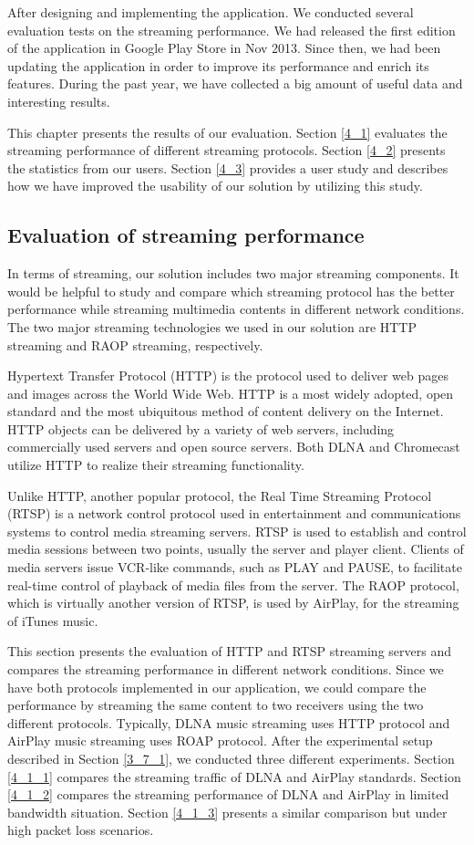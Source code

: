 
After designing and implementing the application. We conducted several
evaluation tests on the streaming performance. We had released the first
edition of the application in Google Play Store in Nov 2013. Since then, we had
been updating the application in order to improve its performance and enrich
its features. During the past year, we have collected a big amount of
useful data and interesting results.

This chapter presents the results of our evaluation. Section \ref{4_1} evaluates
the streaming performance of different streaming protocols. Section \ref{4_2}
presents the statistics from our users. Section \ref{4_3} provides a user study
and describes how we have improved the usability of our solution by utilizing
this study.
\subsection{Evaluation of streaming performance\label{4_1}}
In terms of streaming, our solution includes two major streaming components. It
would be helpful to study and compare which streaming protocol has the better
performance while streaming multimedia contents in different network conditions.
The two major streaming technologies we used in our solution are HTTP streaming
and RAOP streaming, respectively.

Hypertext Transfer Protocol (HTTP) is the protocol used to deliver web pages
and images across the World Wide Web. HTTP is a most widely adopted, open
standard and the most ubiquitous method of content delivery on the Internet.
HTTP objects can be delivered by a variety of web servers, including
commercially used servers and open source servers. Both DLNA and Chromecast utilize
HTTP to realize their streaming functionality.

Unlike HTTP, another popular protocol, the Real Time Streaming Protocol (RTSP)
is a network control protocol used in entertainment and communications systems
to control media streaming servers. RTSP is used to establish and control media
sessions between two points, usually the server and player client. Clients of
media servers issue VCR-like commands, such as PLAY and PAUSE, to facilitate
real-time control of playback of media files from the server.  The RAOP
protocol, which is virtually another version of RTSP, is used by AirPlay, for
the streaming of iTunes music.

This section presents the evaluation of HTTP and RTSP streaming servers and
compares the streaming performance in different network conditions. Since we
have both protocols implemented in our application, we could compare the
performance by streaming the same content to two receivers using the two
different protocols. Typically, DLNA music streaming uses HTTP protocol and
AirPlay music streaming uses ROAP protocol. After the experimental setup
described in Section \ref{3_7_1}, we conducted three different experiments.
Section \ref{4_1_1} compares the streaming traffic of DLNA and AirPlay
standards. Section \ref{4_1_2} compares the streaming performance of DLNA and
AirPlay in limited bandwidth situation. Section \ref{4_1_3} presents a
similar comparison but under high packet loss scenarios.
